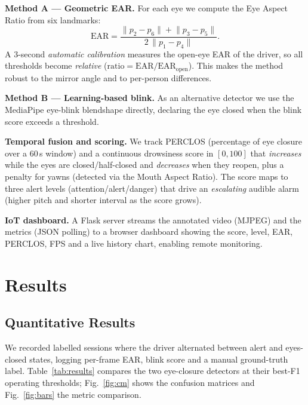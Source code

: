 \documentclass[conference]{IEEEtran}
\begin{document}
\textbf{Method A --- Geometric EAR.} For each eye we compute the Eye Aspect
Ratio from six landmarks:
\begin{equation}
\mathrm{EAR}=\frac{\lVert p_2-p_6\rVert+\lVert p_3-p_5\rVert}{2\,\lVert p_1-p_4\rVert}.
\end{equation}
A 3-second \emph{automatic calibration} measures the open-eye EAR of the driver,
so all thresholds become \emph{relative} ($\mathrm{ratio}=\mathrm{EAR}/\mathrm{EAR}_\text{open}$).
This makes the method robust to the mirror angle and to per-person differences.

\textbf{Method B --- Learning-based blink.} As an alternative detector we use the
MediaPipe eye-blink blendshape directly, declaring the eye closed when the blink
score exceeds a threshold.

\textbf{Temporal fusion and scoring.} We track PERCLOS (percentage of eye
closure over a 60\,s window) and a continuous drowsiness score in $[0,100]$ that
\emph{increases} while the eyes are closed/half-closed and \emph{decreases} when
they reopen, plus a penalty for yawns (detected via the Mouth Aspect Ratio).
The score maps to three alert levels (attention/alert/danger) that drive an
\emph{escalating} audible alarm (higher pitch and shorter interval as the score
grows).

\textbf{IoT dashboard.} A Flask server streams the annotated video (MJPEG) and
the metrics (JSON polling) to a browser dashboard showing the score, level,
EAR, PERCLOS, FPS and a live history chart, enabling remote monitoring.

\section{Results}
\subsection{Quantitative Results}
We recorded labelled sessions where the driver alternated between alert and
eyes-closed states, logging per-frame EAR, blink score and a manual ground-truth
label. Table~\ref{tab:results} compares the two eye-closure detectors at their
best-F1 operating thresholds; Fig.~\ref{fig:cm} shows the confusion matrices and
Fig.~\ref{fig:bars} the metric comparison.
\end{document}

